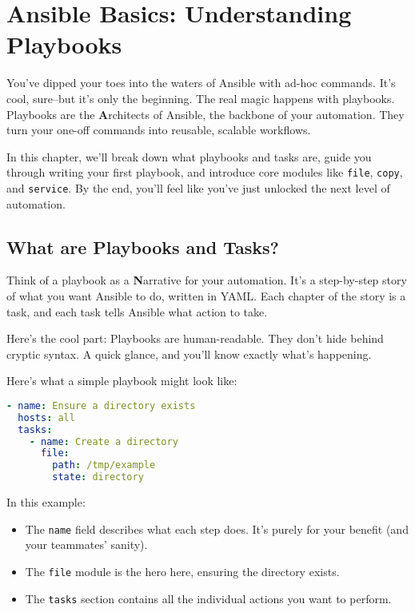 \chapter{Ansible Basics: Understanding Playbooks}

You've dipped your toes into the waters of Ansible with ad-hoc commands. It's cool, sure--but it's only the beginning. The real magic happens with playbooks. Playbooks are the \textbf{A}rchitects of Ansible, the backbone of your automation. They turn your one-off commands into reusable, scalable workflows.

In this chapter, we'll break down what playbooks and tasks are, guide you through writing your first playbook, and introduce core modules like \texttt{file}, \texttt{copy}, and \texttt{service}. By the end, you'll feel like you've just unlocked the next level of automation.

\section{What are Playbooks and Tasks?}

Think of a playbook as a \textbf{N}arrative for your automation. It's a step-by-step story of what you want Ansible to do, written in YAML. Each chapter of the story is a task, and each task tells Ansible what action to take.

Here's the cool part: Playbooks are human-readable. They don't hide behind cryptic syntax. A quick glance, and you'll know exactly what's happening.

Here's what a simple playbook might look like:
\begin{lstlisting}[language=yaml, caption=Example Playbook: Basic Setup]
- name: Ensure a directory exists
  hosts: all
  tasks:
    - name: Create a directory
      file:
        path: /tmp/example
        state: directory
\end{lstlisting}

In this example:
\begin{itemize}
    \item The \texttt{name} field describes what each step does. It's purely for your benefit (and your teammates' sanity).
    \item The \texttt{file} module is the hero here, ensuring the directory exists.
    \item The \texttt{tasks} section contains all the individual actions you want to perform.
\end{itemize}

